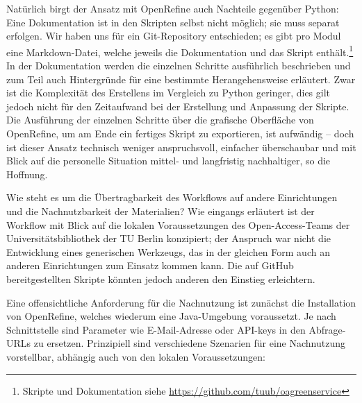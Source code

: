 \documentclass[a4paper,
fontsize=11pt,
oneside,
numbers=noperiodatend,
parskip=half-,
bibliography=totoc,
final
]{scrartcl}
\begin{document}
Natürlich birgt der Ansatz mit OpenRefine auch Nachteile gegenüber
Python: Eine Dokumentation ist in den Skripten selbst nicht möglich; sie
muss separat erfolgen. Wir haben uns für ein Git-Repository entschieden;
es gibt pro Modul eine Markdown-Datei, welche jeweils die Dokumentation
und das Skript enthält.\footnote{Skripte und Dokumentation siehe
  \url{https://github.com/tuub/oagreenservice}} In der Dokumentation
werden die einzelnen Schritte ausführlich beschrieben und zum Teil auch
Hintergründe für eine bestimmte Herangehensweise erläutert. Zwar ist die
Komplexität des Erstellens im Vergleich zu Python geringer, dies gilt
jedoch nicht für den Zeitaufwand bei der Erstellung und Anpassung der
Skripte. Die Ausführung der einzelnen Schritte über die grafische
Oberfläche von OpenRefine, um am Ende ein fertiges Skript zu
exportieren, ist aufwändig -- doch ist dieser Ansatz technisch weniger
anspruchsvoll, einfacher überschaubar und mit Blick auf die personelle
Situation mittel- und langfristig nachhaltiger, so die Hoffnung.

Wie steht es um die Übertragbarkeit des Workflows auf andere
Einrichtungen und die Nachnutzbarkeit der Materialien? Wie eingangs
erläutert ist der Workflow mit Blick auf die lokalen Voraussetzungen des
Open-Access-Teams der Universitätsbibliothek der TU Berlin konzipiert;
der Anspruch war nicht die Entwicklung eines generischen Werkzeugs, das
in der gleichen Form auch an anderen Einrichtungen zum Einsatz kommen
kann. Die auf GitHub bereitgestellten Skripte könnten jedoch anderen den
Einstieg erleichtern.

Eine offensichtliche Anforderung für die Nachnutzung ist zunächst die
Installation von OpenRefine, welches wiederum eine Java-Umgebung
voraussetzt. Je nach Schnittstelle sind Parameter wie E-Mail-Adresse
oder API-keys in den Abfrage-URLs zu ersetzen. Prinzipiell sind
verschiedene Szenarien für eine Nachnutzung vorstellbar, abhängig auch
von den lokalen Voraussetzungen:
\end{document}
